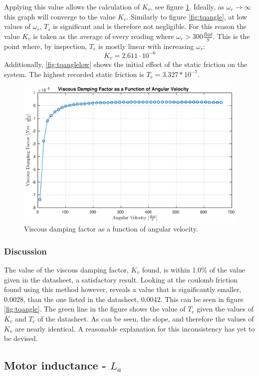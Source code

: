 Applying this value allows the calculation of $K_v$, see figure \ref{fig:visvel}.
Ideally, as $\omega_r\rightarrow \infty$ this graph will converge to the value $K_v$. 
Similarly to figure \ref{fig:tqangle}, at low values of $\omega_r$, $T_s$ is significant and is therefore not negligible.
For this reason the value $K_v$ is taken as the average of every reading where $\omega_r>300\frac{Rad}{S}$. 
This is the point where, by inspection, $T_e$ is mostly linear with increasing $\omega_r$:
$$K_v=2.611\cdot 10^{-6}$$
Additionally, \ref{fig:tqanglelow} shows the initial effect of the static friction on the system.
The highest recorded static friction is $T_s=3.327*10^{-7}$.
\begin{figure}[!h]
	\centering
	\includegraphics[width=.75\linewidth]{graphics/visvel}
	\caption{Viscous damping factor as a function of angular velocity.}
	\label{fig:visvel}
\end{figure}
\subsubsection{Discussion}
The value of the viscous damping factor, $K_v$ found, is within 1.0\% of the value given in the datasheet, a satisfactory result.
Looking at the coulomb friction found using this method however, reveals a value that is significantly smaller, 0.0028, than the one listed in the datasheet, 0.0042.
This can be seen in figure \ref{fig:tqangle}. 
The green line in the figure shows the value of $T_e$ given the values of $K_v$ and $T_c$ of the datasheet.
As can be seen, the slope, and therefore the values of $K_v$ are nearly identical.
A reasonable explanation for this inconsistency has yet to be devised.

\subsection{Motor inductance - $L_a$}
\label{sec:incuctance}
